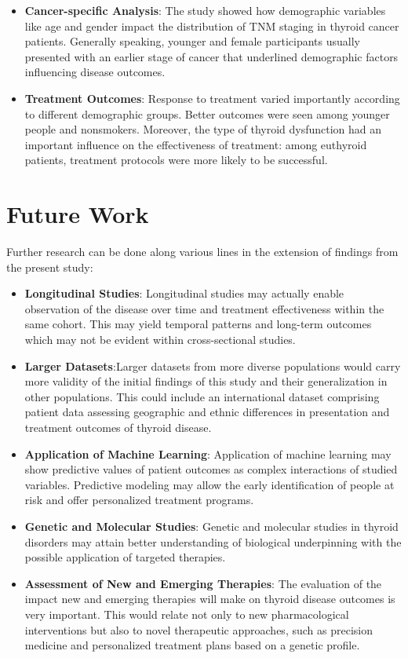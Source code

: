 \documentclass[12pt]{article}
\begin{document}
\begin{itemize}
\item \textbf{Cancer-specific Analysis}: The study showed how demographic variables like age and gender impact the distribution of TNM staging in thyroid cancer patients. Generally speaking, younger and female participants usually presented with an earlier stage of cancer that underlined demographic factors influencing disease outcomes.

\item \textbf{Treatment Outcomes}: Response to treatment varied importantly according to different demographic groups. Better outcomes were seen among younger people and nonsmokers. Moreover, the type of thyroid dysfunction had an important influence on the effectiveness of treatment: among euthyroid patients, treatment protocols were more likely to be successful.

\end{itemize}

\newpage

\section{Future Work}
Further research can be done along various lines in the extension of findings from the present study:

\begin{itemize}
    
    \item \textbf{Longitudinal Studies}: Longitudinal studies may actually enable observation of the disease over time and treatment effectiveness within the same cohort. This may yield temporal patterns and long-term outcomes which may not be evident within cross-sectional studies.
    \item \textbf{Larger Datasets}:Larger datasets from more diverse populations would carry more validity of the initial findings of this study and their generalization in other populations. This could include an international dataset comprising patient data assessing geographic and ethnic differences in presentation and treatment outcomes of thyroid disease.
    \item \textbf{Application of Machine Learning}: Application of machine learning may show predictive values of patient outcomes as complex interactions of studied variables. Predictive modeling may allow the early identification of people at risk and offer personalized treatment programs.
    \item \textbf{Genetic and Molecular Studies}: Genetic and molecular studies in thyroid disorders may attain better understanding of biological underpinning with the possible application of targeted therapies.
\item \textbf{Assessment of New and Emerging Therapies}: The evaluation of the impact new and emerging therapies will make on thyroid disease outcomes is very important. This would relate not only to new pharmacological interventions but also to novel therapeutic approaches, such as precision medicine and personalized treatment plans based on a genetic profile.
\end{itemize}
\end{document}
